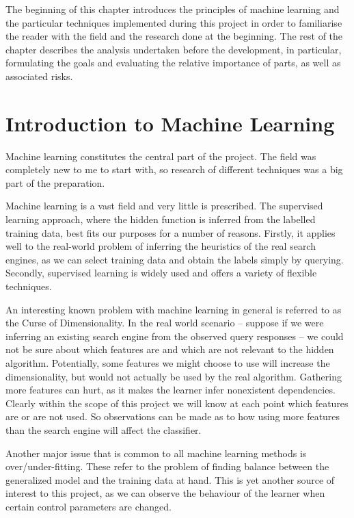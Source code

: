 \documentclass[12pt,notitlepage,twoside]{scrreprt}
\begin{document}
The beginning of this chapter introduces the principles of machine learning and the particular
techniques implemented during this project in order to familiarise the reader with the
field and the research done at the beginning.
The rest of the chapter describes the analysis undertaken before the development, in particular,
formulating the goals and evaluating the relative importance of parts, as well as
associated risks. 

\section{Introduction to Machine Learning}

Machine learning
constitutes the central part of the project. The field was completely new to me
to start with, so research of different techniques was a big part of the
preparation.

Machine learning is a vast field and very little is prescribed.
The supervised learning approach, where the hidden function is
inferred from the labelled training data, best fits our purposes for a number
of reasons. Firstly, it applies well to the real-world problem of inferring the
heuristics of the real search engines, as we can select training data and
obtain the labels simply by querying. Secondly, supervised learning is widely
used and offers a variety of flexible techniques.

An interesting known problem with machine learning in general is referred to as
the Curse of Dimensionality. In the real world scenario -- suppose if we were
inferring an existing search engine from the observed query responses -- we
could not be sure about which features are and which are not relevant to the
hidden algorithm. Potentially, some features we might choose to use will
increase the dimensionality, but would not actually be used by the real
algorithm. Gathering more features can hurt, as it makes the learner infer
nonexistent dependencies. Clearly within the scope of this project we will know
at each point which features are or are not used. So observations can be made
as to how using more features than the search engine will affect the
classifier.

Another major issue that is common to all machine learning methods is
over/under-fitting. These refer to the problem of finding balance between the
generalized model and the training data at hand. This is yet another source of
interest to this project, as we can observe the behaviour of the learner when
certain control parameters are changed.
\end{document}
